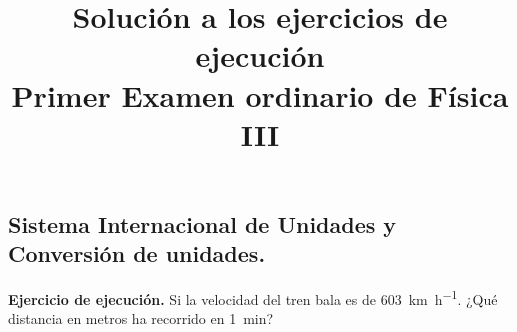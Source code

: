 \documentclass[12pt, letter]{exam}
\date{}
\title{Solución a los ejercicios de ejecución \\ Primer Examen ordinario de Física III}
\begin{document}
\maketitle

\setcounter{page}{2}

\begin{questions}
    \section{Sistema Internacional de Unidades y Conversión de unidades.}
    \setcounter{question}{1} \question \textbf{Ejercicio de ejecución.} Si la velocidad del tren bala es de \SI{603}{\kilo\meter\per\hour}. ¿Qué distancia en metros ha recorrido en \SI{1}{\minute}?
    

\end{questions}
\end{document}
